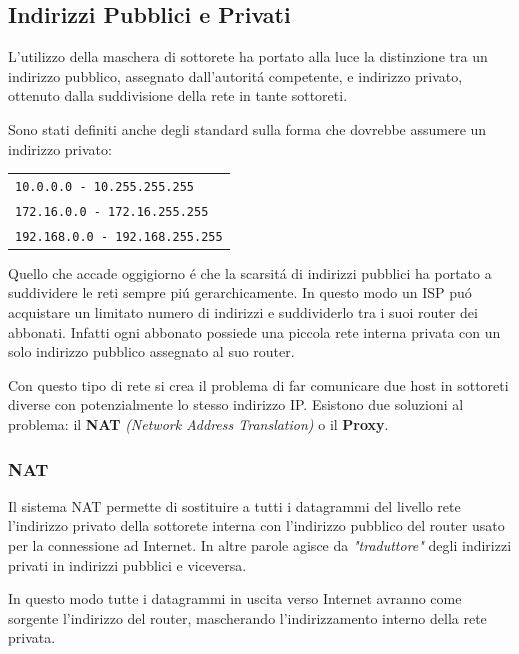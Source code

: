 \documentclass[12pt]{article}
\def\code#1{\texttt{#1}}
\begin{document}
\clearpage
\subsection{Indirizzi Pubblici e Privati}\label{pazio-indirizzamento-in-ip-indirizzi-pubblici-privati}
L'utilizzo della maschera di sottorete ha portato alla luce la distinzione tra un indirizzo pubblico, assegnato 
dall'autorit\'a competente, e indirizzo privato, ottenuto dalla suddivisione della rete in tante sottoreti.

Sono stati definiti anche degli standard sulla forma che dovrebbe assumere un indirizzo privato:
\begin{center}
	\begin{tabular}{l}
		\code{10.0.0.0  - 10.255.255.255}   \\
		\code{172.16.0.0 - 172.16.255.255}  \\
		\code{192.168.0.0 - 192.168.255.255}\\
	\end{tabular}
\end{center}

Quello che accade oggigiorno \'e che la scarsit\'a di indirizzi pubblici ha portato a suddividere le reti sempre pi\'u 
gerarchicamente. In questo modo un ISP pu\'o acquistare un limitato numero di indirizzi e suddividerlo tra i suoi router 
dei abbonati. Infatti ogni abbonato possiede una piccola rete interna privata con un solo indirizzo pubblico assegnato 
al suo router.

Con questo tipo di rete si crea il problema di far comunicare due host in sottoreti diverse con potenzialmente lo stesso 
indirizzo IP. Esistono due soluzioni al problema: il \textbf{NAT} \textit{(Network Address Translation)} o il 
\textbf{Proxy}.

\subsubsection{NAT}\label{pazio-indirizzamento-in-ip-indirizzi-pubblici-privati-nat}
Il sistema NAT permette di sostituire a tutti i datagrammi del livello rete l'indirizzo privato della sottorete interna 
con l'indirizzo pubblico del router usato per la connessione ad Internet. In altre parole agisce da 
\textit{"traduttore"} degli indirizzi privati in indirizzi pubblici e viceversa. 

In questo modo tutte i datagrammi in uscita verso Internet avranno come sorgente l'indirizzo del router, mascherando 
l'indirizzamento interno della rete privata.
\end{document}
